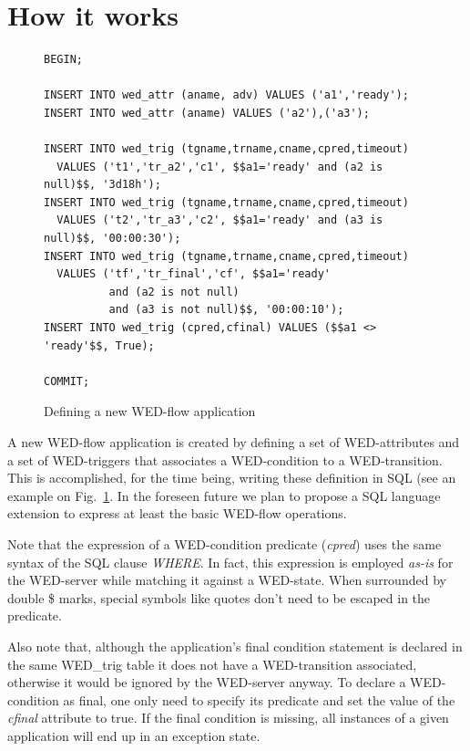 \documentclass[conference]{IEEEtran}
\begin{document}
\section{How it works}
\begin{figure}[!t]
\begin{Verbatim}[fontsize=\tiny]
BEGIN;

INSERT INTO wed_attr (aname, adv) VALUES ('a1','ready');
INSERT INTO wed_attr (aname) VALUES ('a2'),('a3');

INSERT INTO wed_trig (tgname,trname,cname,cpred,timeout) 
  VALUES ('t1','tr_a2','c1', $$a1='ready' and (a2 is null)$$, '3d18h');
INSERT INTO wed_trig (tgname,trname,cname,cpred,timeout) 
  VALUES ('t2','tr_a3','c2', $$a1='ready' and (a3 is null)$$, '00:00:30');
INSERT INTO wed_trig (tgname,trname,cname,cpred,timeout) 
  VALUES ('tf','tr_final','cf', $$a1='ready' 
          and (a2 is not null) 
          and (a3 is not null)$$, '00:00:10');
INSERT INTO wed_trig (cpred,cfinal) VALUES ($$a1 <> 'ready'$$, True);

COMMIT;
\end{Verbatim}
\caption{Defining a new WED-flow application}
\label{code_new}
\end{figure}
 
A new WED-flow application is created by defining a set of WED-attributes and a set of WED-triggers that associates a 
WED-condition to a WED-transition. This is accomplished, for the time being, writing these definition in SQL (see an example
on Fig.~\ref{code_new}. In the foreseen future we plan to propose a SQL language extension to express at least the basic WED-flow operations. 

\par Note that the expression of a WED-condition predicate (\emph{cpred}) uses the same syntax of the SQL clause \emph{WHERE}.
In fact, this expression is employed \emph{as-is} for the WED-server while matching it against a WED-state. When surrounded
by double \$ marks, special symbols like quotes don't need to be escaped in the predicate.

\par  Also note that, although the application's final condition statement is declared in the same WED\_trig table it does not
have a WED-transition associated, otherwise it would be ignored by the WED-server anyway. To declare a WED-condition as
final, one only need to specify its predicate and set the value of the \emph{cfinal} attribute to true. If the final condition
is missing, all instances of a given application will end up in an exception state. 
\end{document}

